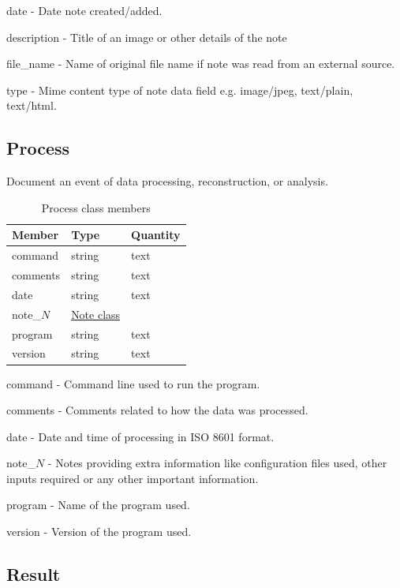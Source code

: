 \documentclass[usletter,11pt]{article}
\newcommand{\member}[2]
{ \noindent
{ \color{softBlue}  #1 - } #2
\vspace{0.2cm}
}
\begin{document}
\member{date}{Date note created/added.}

\member{description}{Title of an image or other details of the note}

\member{file\_name}{Name of original file name if note was read from
 an external source.}

\member{type}{Mime content type of note data field e.g. image/jpeg,
 text/plain, text/html.}

\subsection{Process}
\label{table:process}

Document an event of data processing, reconstruction, or analysis.

\begin{table}[h!]\sffamily \footnotesize
\caption{Process class members}

\begin{tabular}{p{4.5cm} p{4.5cm}  p{2.5cm} }
\toprule
\bfseries Member     & \bfseries Type & \bfseries Quantity \\
\midrule
command & string & text \\
comments & string & text \\
date & string & text \\
note\_$N$ &  \hyperref[table:note]{Note class} & \\
program & string & text \\
version & string & text \\
\bottomrule
\end{tabular}
\end{table}

\member{command}{Command line used to run the program.}

\member{comments}{Comments related to how the data was processed.}

\member{date}{Date and time of processing in ISO 8601 format.}

\member{note\_$N$}{Notes providing extra information like
  configuration files used, other inputs required or any other
  important information.}

\member{program}{Name of the program used.}

\member{version}{Version of the program used.}

\subsection{Result}
\label{table:result}
\end{document}
